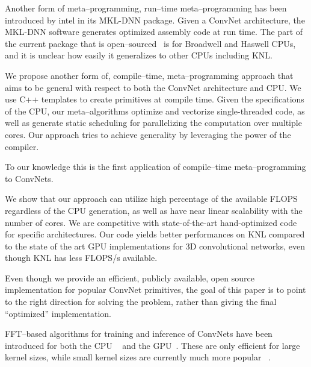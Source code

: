   Another form of meta--programming, run--time meta--programming has
  been introduced by intel in its MKL-DNN package.  Given a ConvNet
  architecture, the MKL-DNN software generates optimized assembly code
  at run time.  The part of the current package that is
  open--sourced~\cite{idlf,mkl-dnn} is for Broadwell and Haswell CPUs,
  and it is unclear how easily it generalizes to other CPUs including
  KNL.

  We propose another form of, compile--time, meta--programming
  approach that aims to be general with respect to both the ConvNet
  architecture and CPU.  We use C++ templates to create primitives at
  compile time.  Given the specifications of the CPU, our
  meta--algorithms optimize and vectorize single-threaded code, as
  well as generate static scheduling for parallelizing the computation
  over multiple cores.  Our approach tries to achieve generality by
  leveraging the power of the compiler.

  To our knowledge this is the first application of compile--time
  meta--programming to ConvNets.

  We show that our approach can utilize high percentage of the
  available FLOPS regardless of the CPU generation, as well as have
  near linear scalability with the number of cores.  We are
  competitive with state-of-the-art hand-optimized code for specific
  architectures.  Our code yields better performances on KNL
  compared to the state of the art GPU implementations for 3D
  convolutional networks, even though KNL has less FLOPS/s available.

  Even though we provide an efficient, publicly available, open source
  implementation for popular ConvNet primitives, the goal of this
  paper is to point to the right direction for solving the problem,
  rather than giving the final ``optimized'' implementation.

  FFT--based algorithms for training and inference of ConvNets have
  been introduced for both the CPU
  ~\cite{zlateski2016znn,zlateski2016znni} and the
  GPU~\cite{mathieu-iclr-14,vasilache2014fast}.  These are only
  efficient for large kernel sizes, while small kernel sizes are
  currently much more popular
  ~\cite{szegedy2015going,ronneberger2015u, simonyan2014very,
    sermanet2013overfeat, long2015fully, tran2015learning, ji20133d,
    maturana_iros_2015, maturana_icra_2014}.

